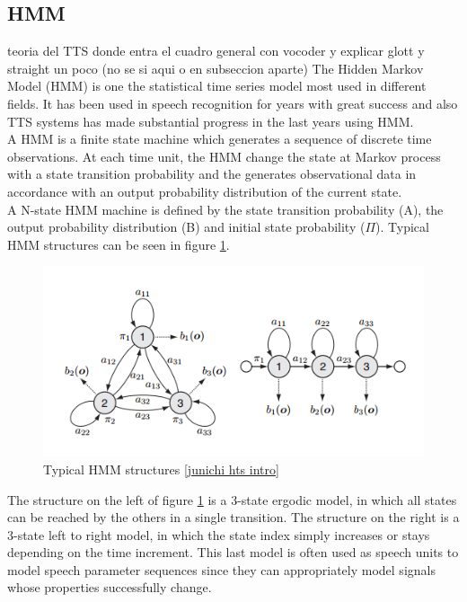\subsection{HMM}\label{hmm}
teoria del TTS donde entra el cuadro general con vocoder y explicar glott y straight un poco (no se si aqui o en subseccion aparte)
The Hidden Markov Model (HMM) is one the statistical time series model most used in different fields. It has been used in speech recognition for years with great success and also TTS systems has made substantial progress in the last years using HMM.\\
A HMM is a finite state machine which generates a sequence of discrete time observations. At each time unit, the HMM change the state at Markov process with a state transition probability and the generates observational data in accordance with an output probability distribution of the current state.\\
A N-state HMM machine is defined by the state transition probability (A), the output probability distribution (B) and initial state probability ($\Pi$). Typical HMM structures can be seen in figure \ref{hmmstruct}.\\
\begin{figure}[!htb]
	\begin{center}
	\includegraphics[width=1\textwidth]{img/hmmstruct.png}
	\end{center}
	\caption{\label{hmmstruct}Typical HMM structures \ref{junichi hts intro}}
\end{figure}
The structure on the left of figure \ref{hmmstruct} is a 3-state ergodic model, in which all states can be reached by the others in a single transition. The structure on the right is a 3-state left to right model, in which the state index simply increases or stays depending on the time increment. This last model is often used as speech units to model speech parameter sequences since they can appropriately model signals whose properties successfully change.\\
